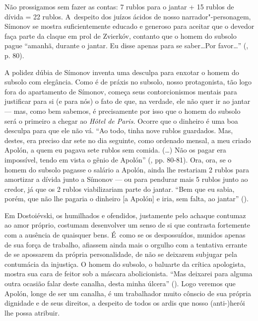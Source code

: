 Não prossigamos sem fazer as contas: 7 rublos para o jantar + 15 rublos
de dívida = 22 rublos. A~despeito dos juízos ácidos de nosso
narrador"-personagem, Símonov se mostra suficientemente educado e
generoso para aceitar que o devedor faça parte da claque em prol de
Zvierkóv, contanto que o homem do subsolo pague ``amanhã, durante o
jantar. Eu disse apenas para se saber\ldots Por favor\ldots'' (, p. 80).

A polidez dúbia de Símonov inventa uma desculpa para enxotar o homem do
subsolo com elegância. Como é de práxis no subsolo, nosso protagonista,
tão logo fora do apartamento de Símonov, começa seus contorcionismos
mentais para justificar para si (e para nós) o fato de que, na verdade,
ele não quer ir ao jantar --- mas, como bem sabemos, é precisamente por
isso que o homem do subsolo será o primeiro a chegar ao \emph{Hôtel de
Paris.} Ocorre que o dinheiro é uma boa desculpa para que ele não vá.
``Ao todo, tinha nove rublos guardados. Mas, destes, era preciso dar
sete no dia seguinte, como ordenado mensal, a meu criado Apolón, a quem
eu pagava sete rublos sem comida. (\ldots) Não os pagar era impossível,
tendo em vista o gênio de Apolón'' (, pp. 80-81). Ora, ora, se o
homem do subsolo pagasse o salário a Apolón, ainda lhe restariam 2
rublos para amortizar a dívida junto a Símonov --- ou para pendurar mais
5 rublos junto ao credor, já que os 2 rublos viabilizariam parte do
jantar. ``Bem que eu sabia, porém, que não lhe pagaria o dinheiro {[}a
Apolón{]} e iria, sem falta, ao jantar'' ().

Em Dostoiévski, os humilhados e ofendidos, justamente pelo achaque
contumaz ao amor próprio, costumam desenvolver um senso de si que
contrasta fortemente com a ausência de quaisquer bens. É~como se os
despossuídos, munidos apenas de sua força de trabalho, afiassem ainda
mais o orgulho com a tentativa errante de se apossarem da própria
personalidade, de não se deixarem subjugar pela contumácia da injustiça.
O homem do subsolo, o baluarte da crítica apologista, mostra sua cara de
feitor sob a máscara abolicionista. ``Mas deixarei para alguma outra
ocasião falar deste canalha, desta minha úlcera'' (). Logo veremos
que Apolón, longe de ser um canalha, é um trabalhador muito cônscio de
sua própria dignidade e de seus direitos, a despeito de todos os ardis
que nosso \mbox{(anti-)herói} lhe possa atribuir.

